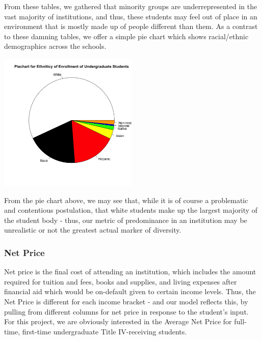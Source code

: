 \documentclass{article}\usepackage[]{graphicx}\usepackage[]{color}
\newenvironment{knitrout}{}{} %
\begin{document}
From these tables, we gathered that minority groups are underrepresented in the vast majority of institutions, and thus, these students may feel out of place in an environment that is mostly made up of people different than them. As a contrast to these damning tables, we offer a simple pie chart which shows racial/ethnic demographics across the schools.

\begin{knitrout}
\color{fgcolor}

{\centering \includegraphics[width=250px]{../images/piechart-enrollmentEthnicity} 

}



\end{knitrout}

From the pie chart above, we may see that, while it is of course a problematic and contentious postulation, that white students make up the largest majority of the student body - thus, our metric of predominance in an institution may be unrealistic or not the greatest actual marker of diversity. 

\subsubsection{Net Price}
Net price is the final cost of attending an institution, which includes the amount required for tuition and fees, books and supplies, and living expenses after financial aid which would be on-default given to certain income levels. Thus, the Net Price is different for each income bracket - and our model reflects this, by pulling from different columns for net price in response to the student's input. For this project, we are obviously interested in the Average Net Price for full-time, first-time undergraduate Title IV-receiving students.\newline
\end{document}
